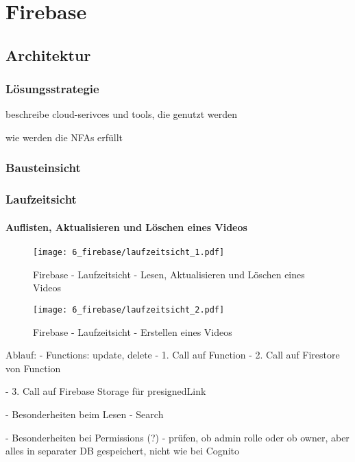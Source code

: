 \chapter{Firebase}

\section{Architektur}

\subsection{Lösungsstrategie}

beschreibe cloud-serivces und tools, die genutzt werden

wie werden die NFAs erfüllt

\subsection{Bausteinsicht}

\subsection{Laufzeitsicht}

\subsubsection{Auflisten, Aktualisieren und Löschen eines Videos}

\begin{figure}
  \centering
  \texttt{[image: 6\_firebase/laufzeitsicht\_1.pdf]}
  \caption{Firebase - Laufzeitsicht - Lesen, Aktualisieren und Löschen eines Videos}
  \label{Firebase:laufzeitsicht1}
\end{figure}

\begin{figure}
  \centering
  \texttt{[image: 6\_firebase/laufzeitsicht\_2.pdf]}
  \caption{Firebase - Laufzeitsicht - Erstellen eines Videos}
  \label{Firebase:laufzeitsicht2}
\end{figure}


Ablauf:
- Functions: update, delete
- 1. Call auf Function
- 2. Call auf Firestore von Function

- 3. Call auf Firebase Storage für presignedLink

- Besonderheiten beim Lesen
  - Search

- Besonderheiten bei Permissions (?)
  - prüfen, ob admin rolle oder ob owner, aber alles in separater DB gespeichert, nicht wie bei Cognito

